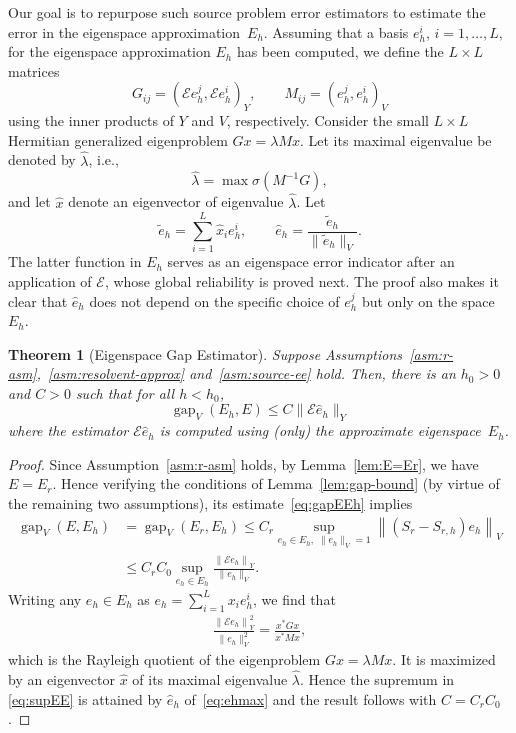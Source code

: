 \documentclass[12pt, oneside, reqno]{amsart}
\newtheorem{theorem}{Theorem}[section]
\theoremstyle{remark}
\renewcommand{\hat}{\widehat}
\DeclareMathOperator{\gap}{gap}
\newcommand{\Srh}{S_{r, h}}
\newcommand{\EE}{\mathcal{E}}
\begin{document}
Our goal is to repurpose such source problem error estimators to
estimate the error in the eigenspace approximation~$E_h$.  Assuming
that a basis $ e_h^i$, $i=1, \dots, L, $ for the eigenspace
approximation $E_h$ has been computed, we define the $L \times L$
matrices
\begin{equation}
\label{eq:5}
G_{ij} = ( \EE e_h^j, \EE e_h^i)_Y, \qquad
M_{ij} = (e_h^j, e_h^i)_V
\end{equation}
using the inner products of $Y$ and $V$, respectively.
Consider the small $L \times L$ Hermitian generalized eigenproblem
$G x = \lambda Mx$.
Let its maximal eigenvalue be denoted by
$\hat \lambda$, i.e.,
\[
  \hat\lambda = \max \sigma(M^{-1}G),
\]
and let
$\hat x$ denote an eigenvector of eigenvalue $\hat \lambda$.
Let 
\begin{equation}
\label{eq:ehmax}
\tilde e_h = \sum_{i=1}^L \hat x_i e_h^i, \qquad
\hat e_h = \frac{\tilde e_h } { \| \tilde e_h \|_V}.
\end{equation}
The latter function in $E_h$ serves as an eigenspace error indicator
after an application of $\EE$, whose global reliability is proved 
next. The proof also makes it clear that $\hat e_h$ does not depend on the
specific choice of $e_h^j$ but only on the space $E_h$.

\begin{theorem}[Eigenspace Gap Estimator]
  \label{thm:espace-gap-estimator}
  Suppose Assumptions~\ref{asm:r-asm},~\ref{asm:resolvent-approx}
  and~\ref{asm:source-ee} hold.  Then, there is an $h_0>0$ and $C>0$
  such that for all $h < h_0$,
  \[
    \gap_V(E_h, E) \le C \| \EE \hat e_h\|_Y
  \]
  where the estimator $\EE \hat e_h$ is computed using (only) the approximate eigenspace~$E_h$.
\end{theorem}
\begin{proof}
  Since Assumption~\ref{asm:r-asm} holds, by Lemma~\ref{lem:E=Er}, we
  have $E = E_r$. Hence verifying the conditions of
  Lemma~\ref{lem:gap-bound} (by virtue of the remaining two
  assumptions), its estimate~\eqref{eq:gapEEh} implies
  \begin{align}
    \nonumber 
    \gap_V( E, E_h)
    & = \gap_V( E_r, E_h) \le C_r
    \sup_{ e_h \in E_h, \; \| e_h \|_V = 1 }
      \left\| ( S_r - \Srh) e_h \right\|_V
    \\ \label{eq:supEE}
    &
      \le C_rC_0 \sup_{ e_h \in E_h}
      \frac{\left\| \EE e_h \right\|_Y}{\| e_h \|_V}.
  \end{align}
  Writing any $e_h \in E_h$ as $e_h = \sum_{i=1}^L x_i e_h^i$, we find that
  \begin{align*}
    \frac{\left\| \EE e_h \right\|_Y^2}{\| e_h \|_V^2}
    = \frac{x^* G x}{ x^*M x}, 
  \end{align*}
  which is the Rayleigh quotient of the eigenproblem
  $G x = \lambda Mx$. It is maximized by an eigenvector $\hat x$ of
  its maximal eigenvalue $\hat \lambda$. Hence the supremum in
  \eqref{eq:supEE} is attained by $\hat e_h$ of~\eqref{eq:ehmax} and
  the result follows with $C = C_rC_0$.
\end{proof}
\end{document}
